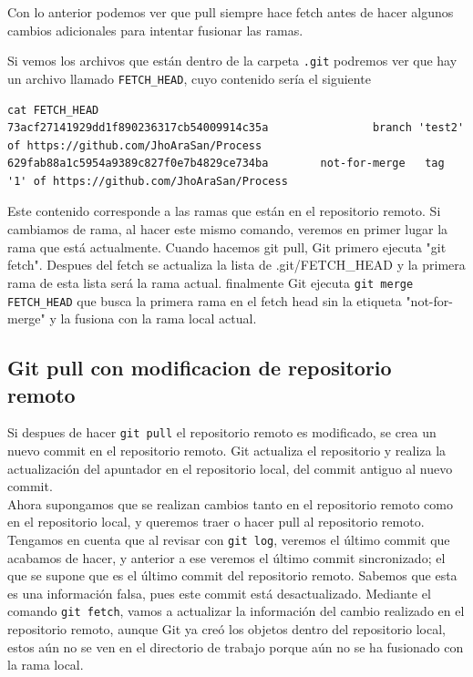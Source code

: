 Con lo anterior podemos ver que pull siempre hace fetch antes de hacer algunos cambios adicionales para 
intentar fusionar las ramas.



Si vemos los archivos que están dentro de la carpeta \texttt{.git} podremos ver que hay un archivo llamado \texttt{FETCH\_HEAD}, cuyo contenido sería el siguiente


\begin{verbatim}
cat FETCH_HEAD
73acf27141929dd1f890236317cb54009914c35a                branch 'test2' of https://github.com/JhoAraSan/Process
629fab88a1c5954a9389c827f0e7b4829ce734ba        not-for-merge   tag '1' of https://github.com/JhoAraSan/Process
\end{verbatim}

Este contenido corresponde a las ramas que están en el repositorio remoto. Si cambiamos de rama, al hacer este mismo comando, veremos en primer lugar la rama que está actualmente. Cuando hacemos git pull, Git primero ejecuta "git fetch". Despues del fetch se actualiza la lista de .git/FETCH\_HEAD y la primera rama de esta lista será la rama actual. 
finalmente Git ejecuta \texttt{git merge FETCH\_HEAD} que busca la primera rama en el fetch head sin la etiqueta "not-for-merge" y la fusiona con la rama local actual. 

\subsection{Git pull con modificacion de repositorio remoto}

Si despues de hacer \texttt{git pull} el repositorio remoto es modificado, se crea un nuevo commit en el repositorio remoto. Git actualiza el repositorio y realiza la actualización del apuntador en el repositorio local, del commit antiguo al nuevo commit. \\

Ahora supongamos que se realizan cambios tanto en el repositorio remoto como en el repositorio local, y queremos traer o hacer pull al repositorio remoto. Tengamos en cuenta que al revisar con \texttt{git log}, veremos el último commit que acabamos de hacer, y anterior a ese veremos el último commit sincronizado; el que se supone que es el último commit del repositorio remoto. Sabemos que esta es una información falsa, pues este commit está desactualizado. Mediante el comando \texttt{git fetch}, vamos a actualizar la información del cambio realizado en el repositorio remoto, aunque Git ya creó los objetos dentro del repositorio local, estos aún no se ven en el directorio de trabajo porque aún no se ha fusionado con la rama local.

